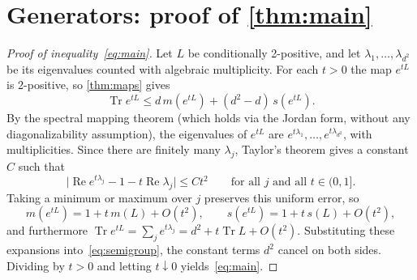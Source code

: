 \documentclass[11pt,a4paper]{article}
\theoremstyle{plain}
\theoremstyle{definition}
\theoremstyle{remark}
\newtheorem{remark}[theorem]{Remark}
\numberwithin{equation}{section}
\newcommand{\Tr}{\operatorname{Tr}}
\newcommand{\Rea}{\operatorname{Re}}
\newcommand{\spec}{\sigma}
\newcommand{\mmin}{m}
\newcommand{\smax}{s}
\begin{document}
\section{Generators: proof of \texorpdfstring{\cref{thm:main}}{Theorem 1}}\label{sec:generators}

\begin{proof}[Proof of inequality~\eqref{eq:main}]
Let $L$ be conditionally 2-positive, and let $\lambda_1,\dots,\lambda_{d^2}$ be its
eigenvalues counted with algebraic multiplicity. For each $t>0$ the map $e^{tL}$ is
2-positive, so \cref{thm:maps} gives
\begin{equation}\label{eq:semigroup}
  \Tr e^{tL}\le d\,\mmin(e^{tL})+(d^2-d)\,\smax(e^{tL}) .
\end{equation}
By the spectral mapping theorem (which holds via the Jordan form,
without any diagonalizability assumption), the eigenvalues of $e^{tL}$ are
$e^{t\lambda_1},\dots,e^{t\lambda_{d^2}}$, with multiplicities. Since there are
finitely many $\lambda_j$, Taylor's theorem gives a constant $C$ such that
\[
  \bigl\lvert\Rea e^{t\lambda_j}-1-t\Rea\lambda_j\bigr\rvert\le Ct^2
  \qquad\text{for all }j\text{ and all }t\in(0,1].
\]
Taking a minimum or maximum over $j$ preserves this uniform error, so
\[
  \mmin(e^{tL})=1+t\,\mmin(L)+O(t^2),\qquad
  \smax(e^{tL})=1+t\,\smax(L)+O(t^2),
\]
and furthermore $\Tr e^{tL}=\sum_je^{t\lambda_j}=d^2+t\Tr L+O(t^2)$.
Substituting these expansions into~\eqref{eq:semigroup}, the constant terms $d^2$ cancel
on both sides. Dividing by $t>0$ and letting $t\downarrow0$ yields~\eqref{eq:main}.
\end{proof}

\end{document}
